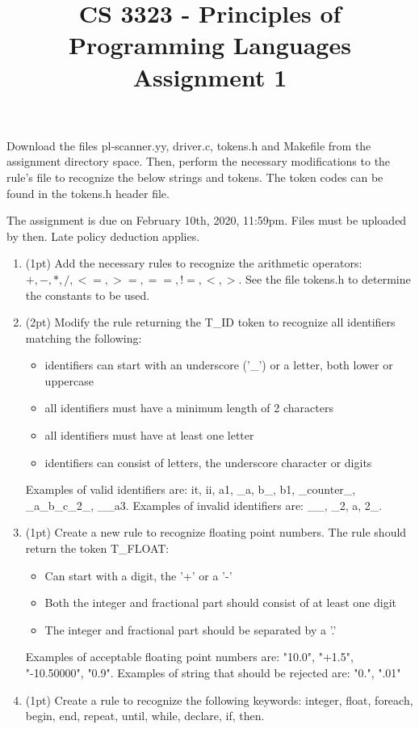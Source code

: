 \documentclass[letter,10pt]{article}
\title{CS 3323 - Principles of Programming Languages\\ Assignment 1}
\date{}
\begin{document}
\vspace{-1in}
\maketitle

Download the files pl-scanner.yy, driver.c, tokens.h and Makefile from the assignment directory space. Then, perform the necessary modifications
to the rule's file to recognize the below strings and tokens. The token codes can be found in the tokens.h header file.

The assignment is due on February 10th, 2020, 11:59pm. Files must be uploaded by then. Late policy deduction applies.

\begin{enumerate}

\item (1pt) Add the necessary rules to recognize the arithmetic operators: $+,-,*,/, <=, >=, ==, !=, <, >$. See the file tokens.h 
to determine the constants to be used.

\item (2pt) Modify the rule returning the T\_ID token to recognize all identifiers matching the following:

  \begin{itemize}
    \item identifiers can start with an underscore ('\_') or a letter, both lower or uppercase
    \item all identifiers must have a minimum length of 2 characters
    \item all identifiers must have at least one letter
    \item identifiers can consist of letters, the underscore character or digits
  \end{itemize}

  Examples of valid identifiers are: it, ii, a1, \_a, b\_, b1, \_counter\_, \_a\_b\_c\_2\_, \_\_a3.
  Examples of invalid identifiers are: \_\_, \_2, a, 2\_.

\item (1pt) Create a new rule to recognize floating point numbers. The rule should return the token T\_FLOAT:

  \begin{itemize}
    \item Can start with a digit, the '+' or a '-'
    \item Both the integer and fractional part should consist of at least one digit
    \item The integer and fractional part should be separated by a '.'
  \end{itemize}

  Examples of acceptable floating point numbers are: "10.0", "+1.5", "-10.50000", "0.9". 
  Examples of string that should be rejected are: "0.", ".01" 

\item (1pt) Create a rule to recognize the following keywords: integer, float, foreach, begin, end, repeat, until, while, declare, if, then.

\end{enumerate}
\end{document}
